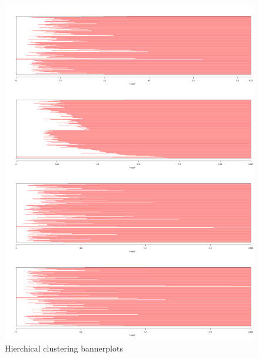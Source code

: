 \documentclass[a4paper,kulak]{kulakarticle}
\begin{document}
\begin{figure}[H]
	\centering
	\includegraphics[height=\textheight]{figures/hierachicalClusteringNoScalingBanner.jpg}
	\caption{Hierchical clustering bannerplots}
	\label{fig:hcnb}
\end{figure}
\end{document}
